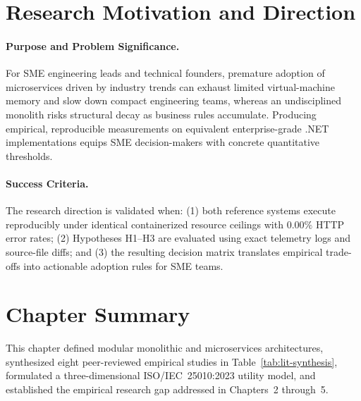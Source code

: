 \section{Research Motivation and Direction}
\label{sec:motivation}

\paragraph{Purpose and Problem Significance.}
For SME engineering leads and technical founders, premature adoption of microservices driven by industry trends can exhaust limited virtual-machine memory and slow down compact engineering teams, whereas an undisciplined monolith risks structural decay as business rules accumulate. Producing empirical, reproducible measurements on equivalent enterprise-grade .NET implementations equips SME decision-makers with concrete quantitative thresholds.

\paragraph{Success Criteria.}
The research direction is validated when: (1) both reference systems execute reproducibly under identical containerized resource ceilings with $0.00\%$ HTTP error rates; (2) Hypotheses H1--H3 are evaluated using exact telemetry logs and source-file diffs; and (3) the resulting decision matrix translates empirical trade-offs into actionable adoption rules for SME teams.

\section{Chapter Summary}
\label{sec:ch1-summary}
This chapter defined modular monolithic and microservices architectures, synthesized eight peer-reviewed empirical studies in Table~\ref{tab:lit-synthesis}, formulated a three-dimensional ISO/IEC~25010:2023 utility model, and established the empirical research gap addressed in Chapters~2 through~5.
